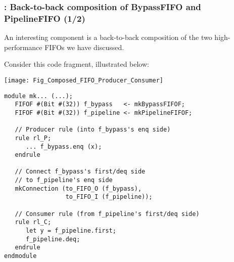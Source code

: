\begin{frame}[fragile]
\frametitle{{\BSV}: Back-to-back composition of BypassFIFO and PipelineFIFO (1/2)}

\label{slide_back_to_back_fifos}

\footnotesize

\begin{minipage}{0.5\textwidth}
An interesting component is a back-to-back composition of the two
high-performance FIFOs we have discussed.

\vspace{2ex}

Consider this code fragment, illustrated below:

\vspace{5ex}

\begin{center}
  \texttt{[image: Fig\_Composed\_FIFO\_Producer\_Consumer]}
\end{center}


\end{minipage}
\hm
\begin{minipage}{0.47\textwidth}\scriptsize
\begin{Verbatim}[frame=single]
module mk... (...);
   FIFOF #(Bit #(32)) f_bypass   <- mkBypassFIFOF;
   FIFOF #(Bit #(32)) f_pipeline <- mkPipelineFIFOF;

   // Producer rule (into f_bypass's enq side)
   rule rl_P;
      ... f_bypass.enq (x);
   endrule

   // Connect f_bypass's first/deq side
   // to f_pipeline's enq side
   mkConnection (to_FIFO_O (f_bypass),
                 to_FIFO_I (f_pipeline));

   // Consumer rule (from f_pipeline's first/deq side)
   rule rl_C;
      let y = f_pipeline.first;
      f_pipeline.deq;
   endrule
endmodule
\end{Verbatim}
\end{minipage}

\end{frame}


